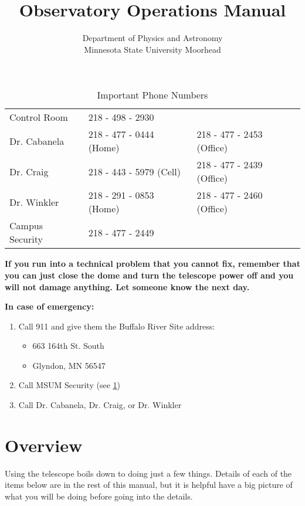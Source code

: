 \documentclass[letterpaper, 12pt]{report}
\begin{document}
\title{Observatory Operations Manual}
\author{Department of Physics and Astronomy\\
	Minnesota State University Moorhead}
\maketitle
\tableofcontents
\newpage

\begin{table}[]
	\centering
	\caption{Important Phone Numbers}
	\label{tbl-phone-numbers}
	\begin{tabular}{lll}
		\hline
		Control Room    & 218 - 498 - 2930        &                           \\
		Dr. Cabanela    & 218 - 477 - 0444 (Home) & 218 - 477 - 2453 (Office) \\
		Dr. Craig       & 218 - 443 - 5979 (Cell) & 218 - 477 - 2439 (Office) \\
		Dr. Winkler     & 218 - 291 - 0853 (Home) & 218 - 477 - 2460 (Office) \\
		Campus Security & 218 - 477 - 2449        &                           \\
	\end{tabular}
\end{table}

\textbf{If you run into a technical problem that you cannot fix, remember that you can just close the dome and turn the telescope power off and you will not damage anything. Let someone know the next day.} \\

\vspace{.25in}

{\huge\textbf{In case of emergency:}}
\begin{enumerate}
	\item Call 911 and give them the Buffalo River Site address:
	\begin{itemize}
		\item [] 663 164th St. South
		\item [] Glyndon, MN 56547
	\end{itemize}
	\item Call MSUM Security (see \ref{tbl-phone-numbers})
	\item Call Dr. Cabanela, Dr. Craig, or Dr. Winkler
\end{enumerate}

\newpage

\chapter{Overview} \label{ch:1}
Using the telescope boils down to doing just a few things. Details of each of the items below are in the rest of this manual, but it is helpful have a big picture of what you will be doing before going into the details.
\end{document}
